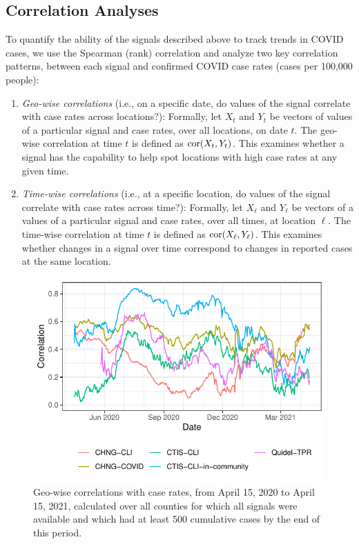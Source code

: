\documentclass[9pt,twocolumn,twoside,lineno]{pnas-new}
\begin{document}
\subsection{Correlation Analyses}

To quantify the ability of the signals described above to track trends in COVID
cases, we use the Spearman (rank) correlation and analyze two key correlation
patterns, between each signal and confirmed COVID case rates (cases per 100,000
people):
\begin{enumerate}
\item \textit{Geo-wise correlations} (i.e., on a specific date, do values of the
  signal correlate with case rates across locations?): Formally, let $X_t$ and
  $Y_t$ be vectors of values of a particular signal and case rates, over all
  locations, on date $t$. The geo-wise correlation at time $t$ is defined as
  $\mathrm{cor}(X_t, Y_t)$. This examines whether a signal has the capability to help
  spot locations with high case rates at any given time.

\item \textit{Time-wise correlations} (i.e., at a specific location, do values
  of the signal correlate with case rates across time?): Formally, let $X_\ell$
  and $Y_\ell$ be vectors of a values of a particular signal and case rates,
  over all times, at location $\ell$. The time-wise correlation at time $t$ is
  defined as $\mathrm{cor}(X_\ell, Y_\ell)$. This examines whether changes in a signal
  over time correspond to changes in reported cases at the same location.
\end{enumerate}

\begin{figure}[t]

  \includegraphics[width=\columnwidth]{fig/geo_wise_corr.pdf}
  \caption{Geo-wise correlations with case rates, from April 15, 2020 to April
    15, 2021, calculated over all counties for which all signals were available
    and which had at least 500 cumulative cases by the end of this period.}
 \label{fig:geo_wise_correlation}
\end{figure}
\end{document}
